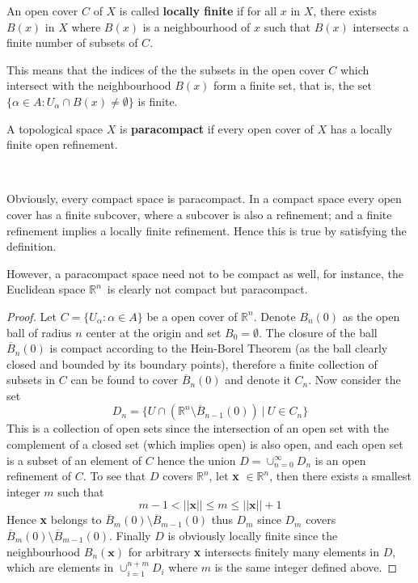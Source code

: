 \documentclass[12pt,twoside]{article}
\newcommand{\rn}{$\mathbb{R}^n$}
\begin{document}
\begin{definition}
An open cover $C$ of $X$ is called \textbf{locally finite} if for all $x$ in $X$, there exists $B(x)$ in $X$ where $B(x)$ is a neighbourhood of $x$ such that $B(x)$ intersects a finite number of subsets of $C$.
\end{definition}
\begin{remark}
This means that the indices of the the subsets in the open cover $C$ which intersect with the neighbourhood $B(x)$ form a finite set, that is, the set $\{\alpha \in A : U_\alpha \cap B(x) \neq \emptyset \}$ is finite.
\end{remark}

\begin{definition}
A topological space $X$ is \textbf{paracompact} if every open cover of $X$ has a locally finite open refinement.
\end{definition}
\\
\begin{remark}
Obviously, every compact space is paracompact. In a compact space every open cover has a finite subcover, where a subcover is also a refinement; and a finite refinement implies a locally finite refinement. Hence this is true by satisfying the definition.
\end{remark}

\begin{example}{}
However, a paracompact space need not to be compact as well, for instance, the Euclidean space \rn\ is clearly not compact but paracompact. \cite{paracompact}
\begin{proof}
Let $C = \{U_\alpha : \alpha \in A \}$ be a open cover of \rn. Denote $B_n(0)$ as the open ball of radius $n$ center at the origin and set $B_0 = \emptyset$. The closure of the ball $\overline{B}_n(0)$ is compact according to the Hein-Borel Theorem (as the ball clearly closed and bounded by its boundary points), therefore a finite collection of subsets in $C$ can be found to cover $\overline{B}_n(0)$ and denote it $C_n$. Now consider the set
\[
D_n = \{U \cap (\mathbb{R}^n \setminus \overline{B}_{n-1}(0))\ |\ U \in C_n\}
\]
This is a collection of open sets since the intersection of an open set with the complement of a closed set (which implies open) is also open, and each open set is a subset of an element of $C$ hence the union $D = \cup_{n = 0}^{\infty}D_n$ is an open refinement of $C$. To see that $D$ covers \rn, let \textbf{x} $\in \mathbb{R}^n$, then there exists a smallest integer $m$ such that 
\[
m-1 < ||\textbf{x}|| \leq m \leq ||\textbf{x}|| + 1
\]
Hence \textbf{x} belongs to $\overline{B}_m(0) \setminus \overline{B}_{m-1}(0)$ thus $D_m$ since $D_m$ covers $\overline{B}_m(0) \setminus \overline{B}_{m-1}(0)$. Finally $D$ is obviously locally finite since the neighbourhood $B_n(\textbf{x})$  for arbitrary \textbf{x} intersects finitely many elements in $D$, which are elements in $\cup_{i=1}^{n+m}D_i$ where $m$ is the same integer defined above.
\end{proof}
\end{example}
\end{document}

